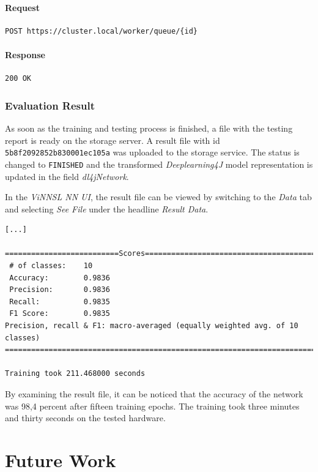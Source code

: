 \subsubsection{Request}\label{request-8}

\begin{verbatim}
POST https://cluster.local/worker/queue/{id}
\end{verbatim}

\subsubsection{Response}\label{response-8}

\begin{verbatim}
200 OK
\end{verbatim}

\subsection{Evaluation Result}\label{evaluation-result-2}

As soon as the training and testing process is finished, a file with the
testing report is ready on the storage server. A result file with id
\texttt{5b8f2092852b830001ec105a} was uploaded to the storage service.
The status is changed to \texttt{FINISHED} and the transformed
\emph{Deeplearning4J} model representation is updated in the field
\emph{dl4jNetwork}.

In the \emph{ViNNSL NN UI}, the result file can be viewed by switching
to the \emph{Data} tab and selecting \emph{See File} under the headline
\emph{Result Data}.

\begin{verbatim}
[...]

==========================Scores========================================
 # of classes:    10
 Accuracy:        0.9836
 Precision:       0.9836
 Recall:          0.9835
 F1 Score:        0.9835
Precision, recall & F1: macro-averaged (equally weighted avg. of 10 classes)
========================================================================

Training took 211.468000 seconds
\end{verbatim}

By examining the result file, it can be noticed that the accuracy of the
network was 98,4 percent after fifteen training epochs. The training
took three minutes and thirty seconds on the tested hardware.

\chapter{Future Work}\label{future-work}

